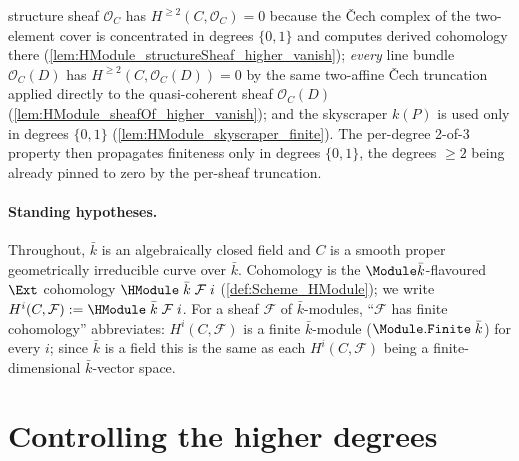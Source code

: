 structure sheaf \(\mathcal O_C\) has \(H^{\ge 2}(C, \mathcal O_C) = 0\)
because the Čech complex of the two-element cover is concentrated in
degrees \(\{0, 1\}\) and computes derived cohomology there
(\cref{lem:HModule_structureSheaf_higher_vanish}); \emph{every} line
bundle \(\mathcal O_C(D)\) has \(H^{\ge 2}(C, \mathcal O_C(D)) = 0\) by
the same two-affine Čech truncation applied directly to the
quasi-coherent sheaf \(\mathcal O_C(D)\)
(\cref{lem:HModule_sheafOf_higher_vanish}); and the skyscraper
\(k(P)\) is used only in degrees \(\{0, 1\}\)
(\cref{lem:HModule_skyscraper_finite}). The per-degree 2-of-3 property
then propagates finiteness only in degrees \(\{0, 1\}\), the degrees
\(\ge 2\) being already pinned to zero by the per-sheaf truncation.

\paragraph{Standing hypotheses.} Throughout, \(\bar k\) is an
algebraically closed field and \(C\) is a smooth proper geometrically
irreducible curve over \(\bar k\).
Cohomology is the \(\Module \bar k\)-flavoured \(\Ext\)
cohomology \(\HModule\;\bar k\;\mathcal F\;i\)
(\cref{def:Scheme_HModule}); we write
\(H^i(C, \mathcal F) := \HModule\;\bar k\;\mathcal F\;i\). For a sheaf
\(\mathcal F\) of \(\bar k\)-modules, ``\(\mathcal F\) has finite
cohomology'' abbreviates: \(H^i(C, \mathcal F)\) is a finite
\(\bar k\)-module (\(\Module.\mathtt{Finite}\;\bar k\)) for every
\(i\); since \(\bar k\) is a field this is the same as each
\(H^i(C, \mathcal F)\) being a finite-dimensional \(\bar k\)-vector
space.


\section{Controlling the higher degrees}
\label{sec:SerreFiniteness_inputs}

